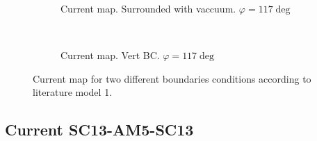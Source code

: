 \documentclass[../main.tex]{subfiles}
\begin{document}
\begin{figure}[H]
    \begin{subfigure}{0.4\textwidth}
        \centering
        
        \caption{Current map. Surrounded with vaccuum. $\varphi = 117 \deg$}
        \label{fig:first}
    \end{subfigure}\\
    \begin{subfigure}{0.4\textwidth}
        \centering
        
        \caption{Current map. Vert BC. $\varphi = 117 \deg$}
        \label{fig:first}
    \end{subfigure}
\caption{Current map for two different boundaries conditions according to literature model 1.}

\end{figure}

\subsection{Current SC13-AM5-SC13}
\end{document}
